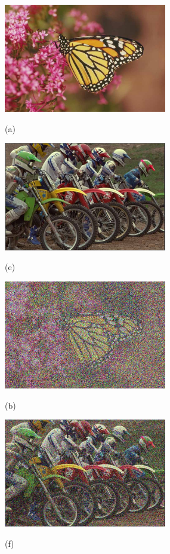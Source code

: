 	\begin{figure}[!]
		\centering
		\begin{minipage}[t]{.49\linewidth}
			\includegraphics[width=2.8in]{LIVE/REF/monarch.jpg}
			\centerline{(a)}
		\end{minipage}
		\begin{minipage}[t]{.49\linewidth}
			\includegraphics[width=2.8in]{LIVE/REF/bikes.jpg}
			\centerline{(e)}
		\end{minipage}
	
		\begin{minipage}[t]{.49\linewidth}
			\includegraphics[width=2.8in]{LIVE/WN/img34.jpg}
			\centerline{(b)}
		\end{minipage}
		\begin{minipage}[t]{.49\linewidth}
			\includegraphics[width=2.8in]{LIVE/WN/img29.jpg}
			\centerline{(f)}
		\end{minipage}
		

\end{figure}
